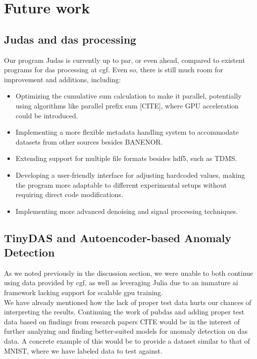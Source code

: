 \section{Future work}
\label{conc:further}

\subsection{Judas and \acrshort{das} processing}

Our program Judas is currently up to par, or even ahead, compared to existent programs for \acrshort{das} processing at \acrshort{cgf}. Even so, there is still much room for improvement and additions, including:

\begin{itemize}
    \item Optimizing the cumulative sum calculation to make it parallel, potentially using algorithms like parallel prefix sum [CITE], where GPU acceleration could be introduced.
    \item Implementing a more flexible metadata handling system to accommodate datasets from other sources besides BANENOR.
    \item Extending support for multiple file formats besides \acrshort{hdf5}, such as TDMS.
    \item Developing a user-friendly interface for adjusting hardcoded values, making the program more adaptable to different experimental setups without requiring direct code modifications.
    \item Implementing more advanced denoising and signal processing techniques.
\end{itemize}

\subsection{TinyDAS and Autoencoder-based Anomaly Detection}

As we noted previously in the discussion section, we were unable to both continue using data provided by \acrshort{cgf}, as well as leveraging Julia due to an immature \acrshort{ai} framework lacking support for scalable \acrshort{gpu} training. \\

We have already mentioned how the lack of proper test data hurts our chances of interpreting the results. Continuing the work of \Gls{pubdas} and adding proper test data based on findings from research papers CITE would be in the interest of further analyzing and finding better-suited models for anomaly detection on \acrshort{das} data. A concrete example of this would be to provide a dataset similar to that of MNIST, where we have labeled data to test against. \\

